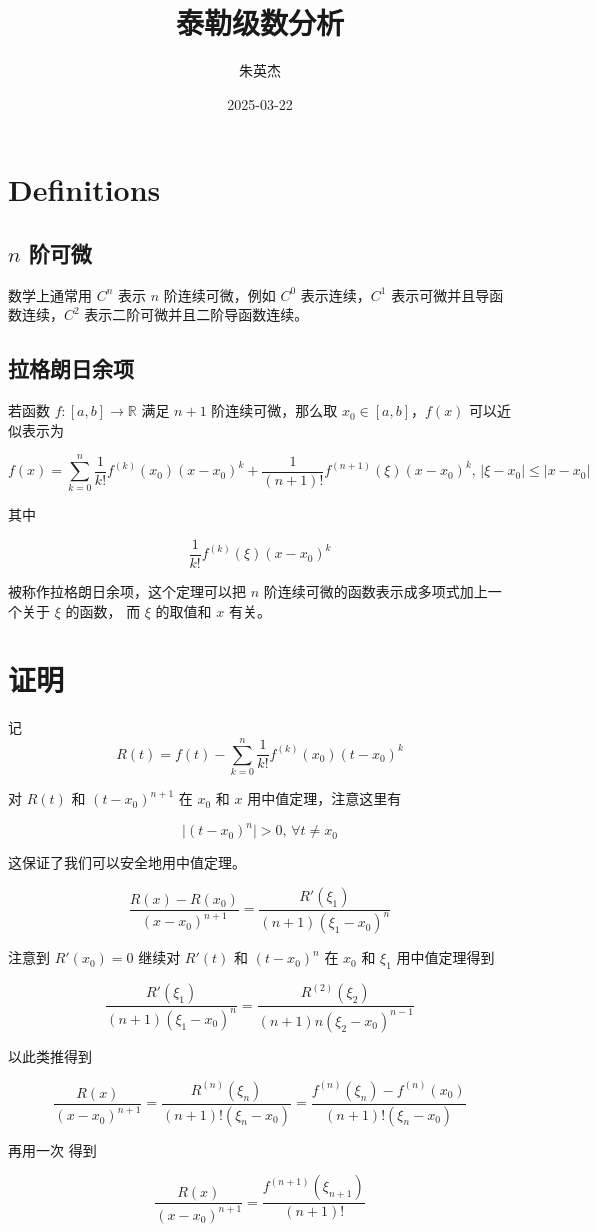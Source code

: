 \documentclass[12pt,a4paper]{ctexart}
\title{泰勒级数分析}
\author{朱英杰}
\date{2025-03-22}
\begin{document}

\maketitle

\section{Definitions}

\subsection{$n$ 阶可微}

数学上通常用 $C^n$ 表示 $n$ 阶连续可微，例如 $C^0$ 表示连续，$C^1$ 表示可微并且导函数连续，$C^2$ 表示二阶可微并且二阶导函数连续。

\subsection{拉格朗日余项}

若函数 $f: [a,b] \to \mathbb{R}$ 满足 $n+1$ 阶连续可微，那么取 $x_0 \in [a,b]$，$f(x)$ 可以近似表示为

\[
f(x) = \sum_{k=0}^{n}\frac{1}{k!}f^{(k)}(x_0)(x-x_0)^k + \frac{1}{(n+1)!}f^{(n+1)}(\xi)(x-x_0)^{k},\, \lvert \xi - x_0 \rvert \le \lvert x - x_0 \rvert
\]

其中

\[
\frac{1}{k!}f^{(k)}(\xi)(x-x_0)^{k}
\]

被称作拉格朗日余项，这个定理可以把 $n$ 阶连续可微的函数表示成多项式加上一个关于 $\xi$ 的函数，
而 $\xi$ 的取值和 $x$ 有关。

\section{证明}

记 
\[
R(t) = f(t) - \sum_{k=0}^{n}\frac{1}{k!}f^{(k)}(x_0)(t-x_0)^k
\]

对 $R(t)$ 和 $(t-x_0)^{n+1}$ 在 $x_0$ 和 $x$ 用中值定理，注意这里有

\[
\lvert(t-x_0)^n \rvert > 0,\, \forall t \ne x_0
\]

这保证了我们可以安全地用中值定理。

\[
\frac{R(x)-R(x_0)}{(x-x_0)^{n+1}} = \frac{R'(\xi_1)}{(n+1)(\xi_1-x_0)^n}
\]

注意到 $R'(x_0) = 0$
继续对 $R'(t)$ 和 $(t-x_0)^{n}$ 在 $x_0$ 和 $\xi_1$ 用中值定理得到

\[
\frac{R'(\xi_1)}{(n+1)(\xi_1-x_0)^n} = \frac{R^{(2)}(\xi_2)}{(n+1)n(\xi_2-x_0)^{n-1}}
\]

以此类推得到

\[
\frac{R(x)}{(x-x_0)^{n+1}} = \frac{R^{(n)}(\xi_n)}{(n+1)!(\xi_n - x_0)} =\frac{f^{(n)}(\xi_n)- f^{(n)}(x_0)}{(n+1)!(\xi_n - x_0)}
\]

再用一次
得到


\[
\frac{R(x)}{(x-x_0)^{n+1}}  =\frac{f^{(n+1)}(\xi_{n+1})}{(n+1)!}
\]
\end{document}
